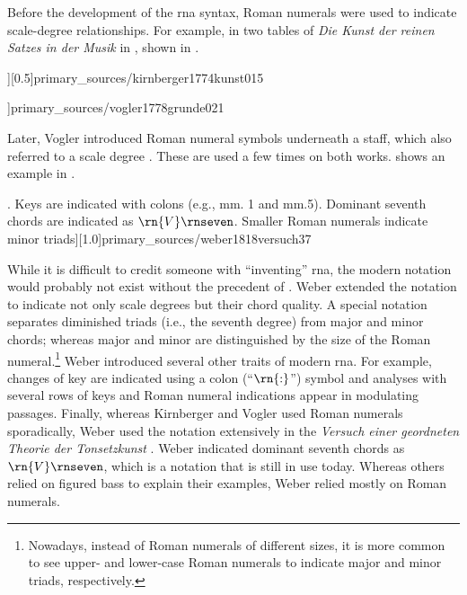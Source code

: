 



Before the development of the \gls{rna} syntax, Roman
numerals were used to indicate scale-degree relationships.
For example, in two tables of \emph{Die Kunst der reinen
Satzes in der Musik} in \textcite{kirnberger1774kunst},
shown in .

\phdfigure[Roman numerals in \textcite[p.
15]{kirnberger1774kunst}][0.5]{primary_sources/kirnberger1774kunst015}
 
\phdfigure[Roman numerals in
\textcite[Tab~XXI]{vogler1778grunde}]{primary_sources/vogler1778grunde021}

Later, Vogler introduced Roman numeral symbols underneath a
staff, which also referred to a scale degree
\parencite{vogler1778grunde, vogler1802handbuch}. These are
used a few times on both works.
 shows an
example in \textcite{vogler1778grunde}.

\phdfigure[Roman numerals in
\textcite[p.~37]{weber1818versuch}. Keys are indicated with
colons (e.g., mm. 1 and mm.5). Dominant seventh chords are
indicated as $\rn{V}\rnseven$. Smaller Roman numerals
indicate minor
triads][1.0]{primary_sources/weber1818versuch37}

While it is difficult to credit someone with ``inventing''
\gls{rna}, the modern notation would probably not exist
without the precedent of \textcite{weber1818versuch}. Weber
extended the notation to indicate not only scale degrees but
their chord quality. A special notation separates diminished
triads (i.e., the seventh degree) from major and minor
chords; whereas major and minor are distinguished by the
size of the Roman numeral.\footnote{Nowadays, instead of
Roman numerals of different sizes, it is more common to see
upper- and lower-case Roman numerals to indicate major and
minor triads, respectively.} Weber introduced several other
traits of modern \gls{rna}. For example, changes of key are
indicated using a colon (``$\rn{:}$'') symbol and analyses
with several rows of keys and Roman numeral indications
appear in modulating passages. Finally, whereas Kirnberger
and Vogler used Roman numerals sporadically, Weber used the
notation extensively in the
\emph{Versuch einer geordneten Theorie der Tonsetzkunst}
\parencite{weber1818versuch}. Weber indicated dominant
seventh chords as $\rn{V}\rnseven$, which is a notation that
is still in use today. Whereas others relied on figured bass
to explain their examples, Weber relied mostly on Roman
numerals.
